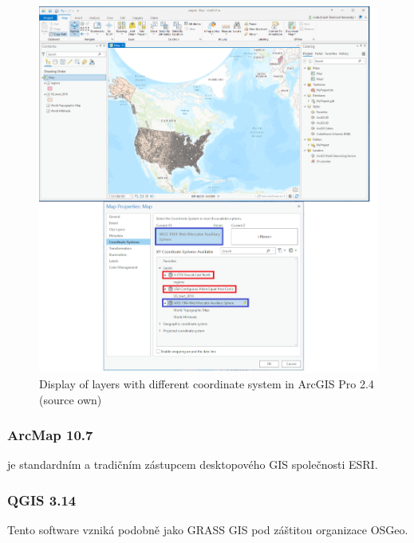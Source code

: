 \documentclass[a4paper,10pt,twoside]{article}
\begin{document}
\vspace{0.3cm}
\begin{figure}[hbt!] 
\begin{center}
\includegraphics[width=15cm]{../pictures/arcgis_pro_onthefly2.png} 
\caption[Display of layers with different coordinate system in ArcGIS Pro 2.4 (source own)]{Display of layers with different coordinate system in ArcGIS Pro 2.4 (source own)}
\label{fig:arcgis_pro_onthefly2}
\end{center}
\end{figure}


\newpage
\vspace*{-1cm}
\subsubsection{ArcMap 10.7}
\noindent
\large
je standardním a tradičním zástupcem desktopového GIS společnosti ESRI.

\newpage
\vspace*{-1cm}
\subsubsection{QGIS 3.14}
\noindent
\large
Tento software vzniká podobně jako GRASS GIS pod záštitou organizace OSGeo.
 
\end{document}
